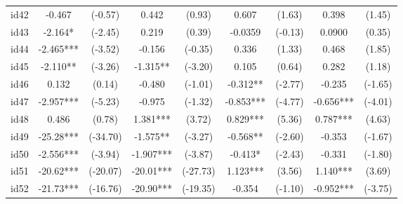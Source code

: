 \documentclass[entropy,article,submit,moreauthors,LaTeX and dvi2pdf]{Definitions/mdpi}
\begin{document}
\begin{center}
\begin{longtable}{ccccccccc}
id42                                          & -0.467        & (-0.57)       & 0.442           & (0.93)           & 0.607             & (1.63)            & 0.398             & (1.45)            \\
id43                                          & -2.164*       & (-2.45)       & 0.219           & (0.39)           & -0.0359           & (-0.13)           & 0.0900            & (0.35)            \\
id44                                          & -2.465***     & (-3.52)       & -0.156          & (-0.35)          & 0.336             & (1.33)            & 0.468             & (1.85)            \\
id45                                          & -2.110**      & (-3.26)       & -1.315**        & (-3.20)          & 0.105             & (0.64)            & 0.282             & (1.18)            \\
id46                                          & 0.132         & (0.14)        & -0.480          & (-1.01)          & -0.312**          & (-2.77)           & -0.235            & (-1.65)           \\
id47                                          & -2.957***     & (-5.23)       & -0.975          & (-1.32)          & -0.853***         & (-4.77)           & -0.656***         & (-4.01)           \\
id48                                          & 0.486         & (0.78)        & 1.381***        & (3.72)           & 0.829***          & (5.36)            & 0.787***          & (4.63)            \\
id49                                          & -25.28***     & (-34.70)      & -1.575**        & (-3.27)          & -0.568**          & (-2.60)           & -0.353            & (-1.67)           \\
id50                                          & -2.556***     & (-3.94)       & -1.907***       & (-3.87)          & -0.413*           & (-2.43)           & -0.331            & (-1.80)           \\
id51                                          & -20.62***     & (-20.07)      & -20.01***       & (-27.73)         & 1.123***          & (3.56)            & 1.140***          & (3.69)            \\
id52                                          & -21.73***     & (-16.76)      & -20.90***       & (-19.35)         & -0.354            & (-1.10)           & -0.952***         & (-3.75)           \\

\end{longtable}
\end{center}
\end{document}
